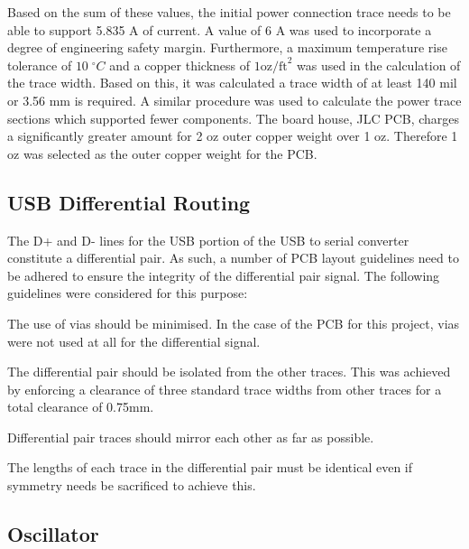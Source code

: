 Based on the sum of these values, the initial power connection trace needs to be able to support 5.835 A of current. A value of 6 A was used to incorporate a degree of engineering safety margin. Furthermore, a maximum temperature rise tolerance of $10\;^{\circ}C$ and a copper thickness of $1 \text{oz/ft}^2$ was used in the calculation of the trace width. Based on this, it was calculated a trace width of at least 140 mil or 3.56 mm is required. A similar procedure was used to calculate the power trace sections which supported fewer components. The board house, JLC PCB, charges a significantly greater amount for 2 oz outer copper weight over 1 oz. Therefore 1 oz was selected as the outer copper weight for the PCB. 

\subsection{USB Differential Routing}

The D+ and D- lines for the USB portion of the USB to serial converter constitute a differential pair. As such, a number of \ac{PCB} layout guidelines need to be adhered to ensure the integrity of the differential pair signal. The following guidelines were considered for this purpose:

\begin{compactitem}
	\item The use of vias should be minimised. In the case of the PCB for this project, vias were not used at all for the differential signal.
	\item The differential pair should be isolated from the other traces. This was achieved by enforcing a clearance of three standard trace widths from other traces for a total clearance of 0.75mm.
	\item Differential pair traces should mirror each other as far as possible.
	\item The lengths of each trace in the differential pair must be identical even if symmetry needs be sacrificed to achieve this.
\end{compactitem}



\subsection{Oscillator}


